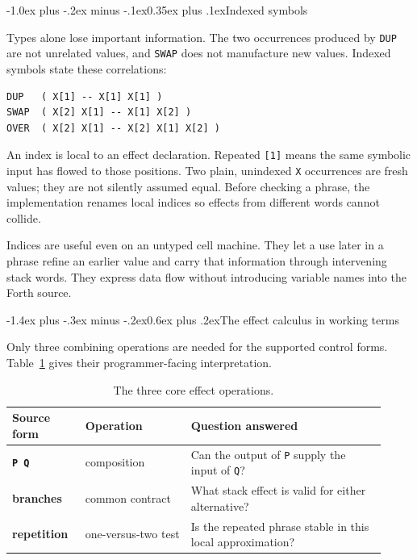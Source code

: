\documentclass[a4paper,10pt]{article}
\makeatletter
\renewcommand\section{\@startsection{section}{1}{\z@}%
  {-1.4ex plus -.3ex minus -.2ex}{0.6ex plus .2ex}{\large\bfseries}}
\renewcommand\subsection{\@startsection{subsection}{2}{\z@}%
  {-1.0ex plus -.2ex minus -.1ex}{0.35ex plus .1ex}{\normalsize\bfseries}}
\makeatother
\begin{document}
\subsection{Indexed symbols}

Types alone lose important information.  The two occurrences produced by
\texttt{DUP} are not unrelated values, and \texttt{SWAP} does not manufacture
new values.  Indexed symbols state these correlations:
\begin{lstlisting}
DUP   ( X[1] -- X[1] X[1] )
SWAP  ( X[2] X[1] -- X[1] X[2] )
OVER  ( X[2] X[1] -- X[2] X[1] X[2] )
\end{lstlisting}
An index is local to an effect declaration.  Repeated \texttt{[1]} means the
same symbolic input has flowed to those positions.  Two plain, unindexed
\texttt{X} occurrences are fresh values; they are not silently assumed equal.
Before checking a phrase, the implementation renames local indices so effects
from different words cannot collide.

Indices are useful even on an untyped cell machine.  They let a use later in a
phrase refine an earlier value and carry that information through intervening
stack words.  They express data flow without introducing variable names into
the Forth source.

\section{The effect calculus in working terms}

Only three combining operations are needed for the supported control forms.
Table~\ref{tab:operations} gives their programmer-facing interpretation.

\begin{table}[h]
\centering
\small
\begin{tabular}{@{}>{\bfseries}p{0.18\linewidth}p{0.26\linewidth}p{0.48\linewidth}@{}}
\hline
Source form & Operation & Question answered \\
\hline
\texttt{P Q} & composition & Can the output of \texttt{P} supply the input of \texttt{Q}? \\
branches & common contract & What stack effect is valid for either alternative? \\
repetition & one-versus-two test & Is the repeated phrase stable in this local approximation? \\
\hline
\end{tabular}
\caption{The three core effect operations.}
\label{tab:operations}
\end{table}
\end{document}

